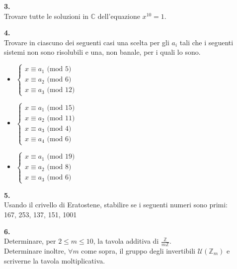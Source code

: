 \documentclass[italian,a4paper,11pt]
{article}
\newcommand{\Z}{\mathbb Z}
\newcommand{\C}{\mathbb{C}}
\begin{document}
\vspace{0.4cm}
\noindent
\begin{Ex}\textbf{ 3.}\\
Trovare tutte le soluzioni in $\C$ dell'equazione $x^{10} = 1$.
\end{Ex}

\vspace{1cm}
\noindent
\begin{Ex}\textbf{ 4.}\\
Trovare in ciascuno dei seguenti casi una scelta per gli $a_i$ tali che i seguenti sistemi non sono risolubili e una, non banale, per i quali lo sono.
\begin{itemize}
\item $  \begin{cases} x\equiv a_1 \textrm{  (mod 5)} \\ x\equiv a_2 \textrm{  (mod 6)} \\ x\equiv a_3 \textrm{  (mod 12)} \end{cases} $
\item $  \begin{cases} x\equiv a_1 \textrm{  (mod 15)} \\ x\equiv a_2 \textrm{  (mod 11)} \\ x\equiv a_3 \textrm{  (mod 4)} \\ x\equiv a_4 \textrm{  (mod 6)}\end{cases} $

\item $  \begin{cases} x\equiv a_1 \textrm{  (mod 19)} \\ x\equiv a_2 \textrm{  (mod 8)} \\ x\equiv a_3 \textrm{  (mod 6)}\end{cases} $

\end{itemize}
\end{Ex}


\vspace{0.4cm}
\noindent
\begin{Ex}\textbf{ 5.}\\
Usando il crivello di Eratostene, stabilire se i seguenti numeri sono primi:\\
167, 253, 137, 151, 1001

\end{Ex}

\vspace{0.4cm}
\noindent
\begin{Ex}\textbf{ 6.}\\ 
Determinare, per $2\leq m \leq 10$, la tavola additiva di $\frac{\Z}{m\Z}$.\\
Determinare inoltre, $\forall m$ come sopra, il gruppo degli invertibili $\mathcal{U}(\Z_m)$ e scriverne la tavola moltiplicativa.
\end{Ex}
\end{document}
